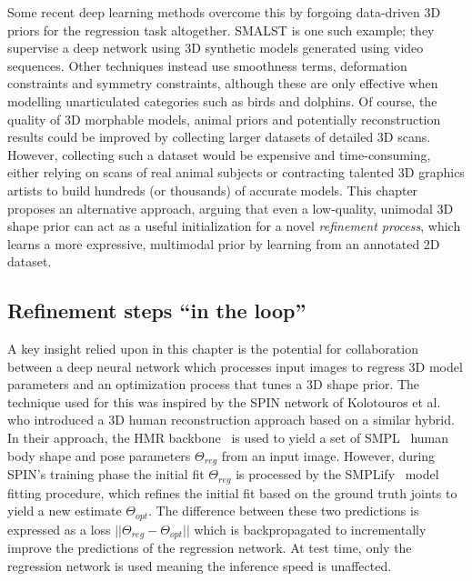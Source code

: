 Some recent deep learning methods overcome this by forgoing data-driven 3D priors for the regression task altogether. SMALST is one such example; they supervise a deep network using 3D synthetic models generated using video sequences. Other techniques  instead use smoothness terms, deformation constraints and symmetry constraints, although these are only effective when modelling unarticulated categories such as birds and dolphins. Of course, the quality of 3D morphable models, animal priors and potentially reconstruction results could be improved by collecting larger datasets of detailed 3D scans. However, collecting such a dataset would be expensive and time-consuming, either relying on scans of real animal subjects or contracting talented 3D graphics artists to build hundreds (or thousands) of accurate models. This chapter proposes an alternative approach, arguing that even a low-quality, unimodal 3D shape prior can act as a useful initialization for a novel \emph{refinement process}, which learns a more expressive, multimodal prior by learning from an annotated 2D dataset.

\subsection{Refinement steps ``in the loop''}

A key insight relied upon in this chapter is the potential for collaboration between a deep neural network which processes input images to regress 3D model parameters and an optimization process that tunes a 3D shape prior. The technique used for this was inspired by the SPIN network of Kolotouros et al. who introduced a 3D human reconstruction approach based on a similar hybrid. In their approach, the HMR backbone~ is used to yield a set of SMPL~ human body shape and pose parameters $\Theta_{reg}$ from an input image. However, during SPIN's training phase the initial fit $\Theta_{reg}$ is processed by the SMPLify~ model fitting procedure, which refines the initial fit based on the ground truth joints to yield a new estimate $\Theta_{opt}$. The difference between these two predictions is expressed as a loss $||\Theta_{reg} - \Theta_{opt}||$ which is backpropagated to incrementally improve the predictions of the regression network. At test time, only the regression network is used meaning the inference speed is unaffected. 

